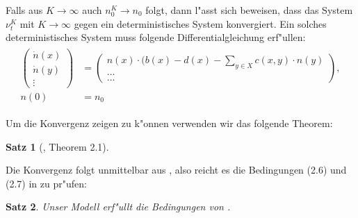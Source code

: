 \documentclass[11pt, a4paper, german]{article}
\theoremstyle{plain}
\newtheorem{satz}{Satz}[section]
\newcommand{\trvec}[3]{\begin{pmatrix}#1\\#2\\#3\end{pmatrix}}
\begin{document}
	Falls aus $ K \to \infty $ auch $ n_0^K \to n_0 $ folgt, dann l"asst sich beweisen, dass das System $ \nu_t^K $ mit $ K \to \infty $ gegen ein deterministisches System konvergiert. Ein solches deterministisches System muss folgende Differentialgleichung erf"ullen:
	\begin{align}
	\begin{split}
		\trvec{\dot{n}(x)}{\dot{n}(y)}{\vdots} &= \trvec{n(x) \cdot ( b(x) - d(x) - \sum_{y \in X}c(x,y)\cdot n(y)}{\dots}{\dots},\\
		n(0) &= n_0 
	\end{split}
	\end{align}
	
	Um die Konvergenz zeigen zu k"onnen verwenden wir das folgende Theorem:
	
	\begin{satz}[\cite{ethier2009markov}, Theorem 2.1]
	\end{satz}
	
	
	Die Konvergenz folgt unmittelbar aus \cite[\textbf{Thm 2.1}]{ethier2009markov}, also reicht es die Bedingungen (2.6) und (2.7) in \cite[\textbf{Thm 2.1}]{ethier2009markov} zu pr"ufen:

	\begin{satz}
		Unser Modell erf"ullt die Bedingungen von \cite[\textbf{Theorem 2.1}]{ethier2009markov}.
	\end{satz}
	
\end{document}
